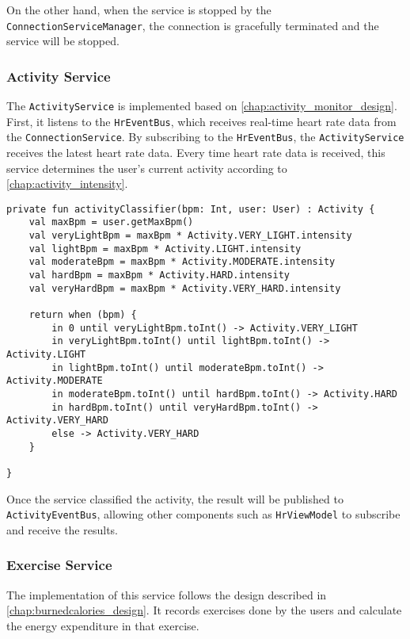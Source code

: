 On the other hand, when the service is stopped by the \verb;ConnectionServiceManager;, the connection is gracefully terminated and the service will be stopped.

\subsubsection{Activity Service}
The \verb;ActivityService; is implemented based on \autoref{chap:activity_monitor_design}.
First, it listens to the \verb;HrEventBus;, which receives real-time heart rate data from the \verb;ConnectionService;. 
By subscribing to the \verb;HrEventBus;, the \verb;ActivityService; receives the latest heart rate data.
Every time heart rate data is received, this service determines the user's current activity according to \autoref{chap:activity_intensity}.
\begin{lstlisting}[caption={Activity classifier (Kotlin - ActivityService)}]
private fun activityClassifier(bpm: Int, user: User) : Activity {
    val maxBpm = user.getMaxBpm()
    val veryLightBpm = maxBpm * Activity.VERY_LIGHT.intensity
    val lightBpm = maxBpm * Activity.LIGHT.intensity
    val moderateBpm = maxBpm * Activity.MODERATE.intensity
    val hardBpm = maxBpm * Activity.HARD.intensity
    val veryHardBpm = maxBpm * Activity.VERY_HARD.intensity

    return when (bpm) {
        in 0 until veryLightBpm.toInt() -> Activity.VERY_LIGHT
        in veryLightBpm.toInt() until lightBpm.toInt() -> Activity.LIGHT
        in lightBpm.toInt() until moderateBpm.toInt() -> Activity.MODERATE
        in moderateBpm.toInt() until hardBpm.toInt() -> Activity.HARD
        in hardBpm.toInt() until veryHardBpm.toInt() -> Activity.VERY_HARD
        else -> Activity.VERY_HARD
    }

}
\end{lstlisting}

Once the service classified the activity, the result will be published to \verb;ActivityEventBus;, allowing other components such as \verb;HrViewModel; to subscribe and receive the results.

\subsubsection{Exercise Service}
The implementation of this service follows the design described in \autoref{chap:burnedcalories_design}.
It records exercises done by the users and calculate the energy expenditure in that exercise.

